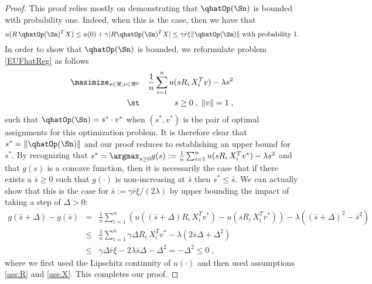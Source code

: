 \begin{proof}
This proof relies mostly on demonstrating that $\qhatOp(\Sn)$ is bounded with probability one. Indeed, when this is the case, then we have that 
\[ u(R\,\qhatOp(\Sn)^T X) \leq u(0) + \gamma | R\qhatOp(\Sn)^TX| \leq \gamma\bar{r}\xi \|\qhatOp(\Sn)\|\;\mbox{with probability $1$.}\]
In order to show that $\qhatOp(\Sn)$ is bounded, we reformulate problem \eqref{EUFhatReg} as follows
  \begin{eqnarray*}
  \maximize_{s\in\Re,v\in\Re^p} && \frac{1}{n}\sum_{i=1}^n u(s R_i\,X_i^T v) - \lambda s^2\\
\st&& s\geq0\;,\;\|v\|=1\;,
  \end{eqnarray*}
such that $\qhatOp(\Sn) =s^*\cdot v^*$ when $(s^*,v^*)$ is the pair of optimal assignments for this optimization problem. It is therefore clear that $s^*=\|\qhatOp(\Sn)\|$ and our proof reduces to establishing an upper bound for $s^*$.  By recognizing that $s^*=\argmax_{s\geq 0} g(s):=\frac{1}{n}\sum_{i=1}^n u(s R_i\,X_i^T v^*) - \lambda s^2$ and that $g(s)$ is a concave function, then it is necessarily the case that if there exists a $\bar{s}\geq 0$ such that $g(\cdot)$ is non-increasing at $\bar{s}$ then $s^* \leq \bar{s}$. We can actually show that this is the case for $\bar{s}:= \gamma\bar{r}\xi/(2\lambda)$ by upper bounding the impact of taking a step of $\Delta>0$: 
\begin{eqnarray*}
g(\bar{s}+\Delta)-g(\bar{s}) &=& \frac{1}{n}\sum_{i=1}^n (u((\bar{s}+\Delta) R_i\,X_i^T v^*) - u(\bar{s} R_i\,X_i^T v^*) ) - \lambda ((\bar{s}+\Delta)^2-\bar{s}^2)\\
&\leq & \frac{1}{n}\sum_{i=1}^n \gamma \Delta R_i\,X_i^T v^* - \lambda (2\bar{s}\Delta + \Delta^2)\\
&\leq & \gamma \Delta \bar{r} \xi  - 2\lambda \bar{s}\Delta -  \Delta^2 = -  \Delta^2 \leq 0\;,
\end{eqnarray*}
where we first used the Lipschitz continuity of $u(\cdot)$ and then used assumptions \ref{ass:R} and \ref{ass:X}. This completes our proof.
\end{proof}

